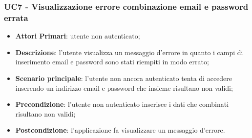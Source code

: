 \subsubsection{UC7 - Visualizzazione errore combinazione email e password errata}
\begin{itemize}
	\item \textbf{Attori Primari}: utente non autenticato;
	\item \textbf{Descrizione}: l'utente visualizza un messaggio d'errore in quanto i campi di inserimento email e password sono stati riempiti in modo errato;
	\item \textbf{Scenario principale}: l'utente non ancora autenticato tenta di accedere inserendo un indirizzo email e password che insieme risultano non validi;	
	\item \textbf{Precondizione}: l'utente non autenticato inserisce i dati che combinati risultano non validi;
	\item \textbf{Postcondizione}: l'applicazione fa visualizzare un messaggio d'errore.
\end{itemize}

